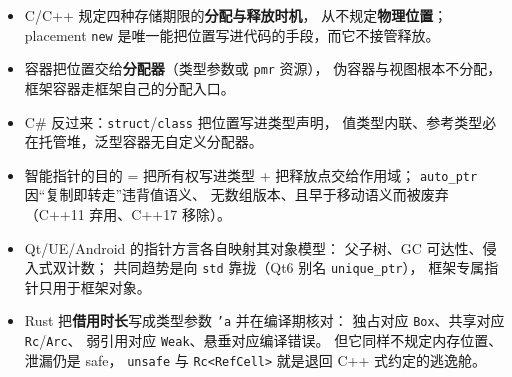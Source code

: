 \documentclass[12pt,a4paper,fontset=fandol]{ctexbook}
\begin{document}
\begin{guideline}[title=本章小结]
\begin{itemize}
  \item C/C++ 规定四种存储期限的\textbf{分配与释放时机}，
        从不规定\textbf{物理位置}；placement \texttt{new}
        是唯一能把位置写进代码的手段，而它不接管释放。
  \item 容器把位置交给\textbf{分配器}（类型参数或 \texttt{pmr} 资源），
        伪容器与视图根本不分配，框架容器走框架自己的分配入口。
  \item C\# 反过来：\texttt{struct}/\allowbreak{}\texttt{class} 把位置写进类型声明，
        值类型内联、参考类型必在托管堆，泛型容器无自定义分配器。
  \item 智能指针的目的 = 把所有权写进类型 + 把释放点交给作用域；
        \texttt{auto\_ptr} 因``复制即转走''违背值语义、
        无数组版本、且早于移动语义而被废弃（C++11 弃用、C++17 移除）。
  \item Qt/UE/Android 的指针方言各自映射其对象模型：
        父子树、GC 可达性、侵入式双计数；
        共同趋势是向 \texttt{std} 靠拢（Qt6 别名 \texttt{unique\_ptr}），
        框架专属指针只用于框架对象。
  \item Rust 把\textbf{借用时长}写成类型参数 \texttt{'a} 并在编译期核对：
        独占对应 \texttt{Box}、共享对应 \texttt{Rc}/\allowbreak{}\texttt{Arc}、
        弱引用对应 \texttt{Weak}、悬垂对应编译错误。
        但它同样不规定内存位置、泄漏仍是 safe，
        \texttt{unsafe} 与 \texttt{Rc<RefCell>} 就是退回 C++ 式约定的逃逸舱。
\end{itemize}
\end{guideline}
\end{document}
